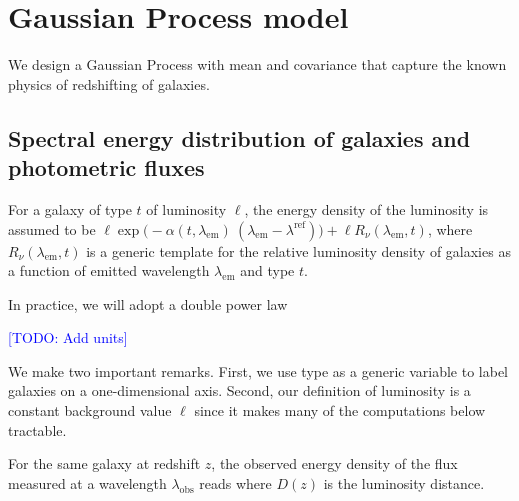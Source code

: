 \documentclass[aps,prd,showpacs,superscriptaddress,groupedaddress]{revtex4}  %
\newcommand{\todo}[1]{\textcolor{blue}{[TODO: #1]}}
\begin{document}
\section{Gaussian Process model}

We design a Gaussian Process with mean and covariance that capture the known physics of redshifting of galaxies.

\subsection{Spectral energy distribution of galaxies and photometric fluxes}

For a galaxy of type $t$ of luminosity $\ell$, the energy density of the luminosity is assumed to be $\ell \exp\bigl(-\alpha(t,\lambda_\mathrm{em})\ (\lambda_\mathrm{em}-\lambda^\mathrm{ref})\bigr)  + \ell R_\nu(\lambda_\mathrm{em},t)$, where $R_\nu(\lambda_\mathrm{em},t)$ is a generic template for the relative luminosity density of galaxies as a function of emitted wavelength $\lambda_\mathrm{em}$ and type $t$.

In practice, we will adopt a double power law

\todo{Add units}

We make two important remarks.
First, we use type as a generic variable to label galaxies on a one-dimensional axis. 
Second, our definition of luminosity is a constant background value $\ell$ since it makes many of the computations below tractable.

For the same galaxy at redshift $z$, the observed energy density of the flux measured at a wavelength $\lambda_\mathrm{obs}$ reads
where $D(z)$ is the luminosity distance.
\end{document}
